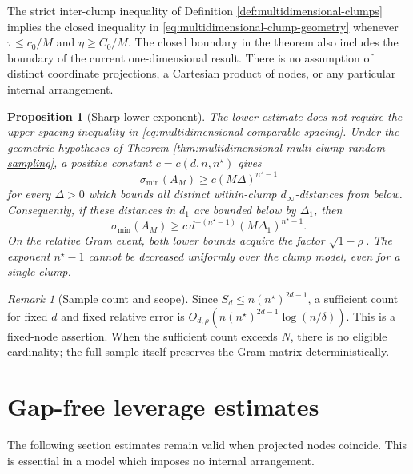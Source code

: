 \documentclass[11pt]{article}
\newtheorem{proposition}[theorem]{Proposition}
\theoremstyle{definition}\newtheorem{definition}[theorem]{Definition}
\theoremstyle{remark}\newtheorem{remark}[theorem]{Remark}
\begin{document}
The strict inter-clump inequality of Definition
\ref{def:multidimensional-clumps} implies the closed inequality in
\eqref{eq:multidimensional-clump-geometry} whenever
$\tau\le c_0/M$ and $\eta\ge C_0/M$. The closed boundary in the theorem
also includes the boundary of the current one-dimensional result.
There is no assumption of distinct coordinate projections, a Cartesian
product of nodes, or any particular internal arrangement.

\begin{proposition}[Sharp lower exponent]\label{prop:multidimensional-sharp-lower}
The lower estimate does not require the upper spacing inequality in
\eqref{eq:multidimensional-comparable-spacing}. Under the geometric
hypotheses of Theorem
\ref{thm:multidimensional-multi-clump-random-sampling}, a positive constant
$c=c(d,n,n^\star)$ gives
\[
 \sigma_{\min}(A_M)\ge c(M\Delta)^{n^\star-1}
\]
for every $\Delta>0$ which bounds all distinct within-clump
$d_\infty$-distances from below. Consequently, if these distances in $d_1$
are bounded below by $\Delta_1$, then
\[
 \sigma_{\min}(A_M)\ge c\,d^{-(n^\star-1)}(M\Delta_1)^{n^\star-1}.
\]
On the relative Gram event, both lower bounds acquire the factor
$\sqrt{1-\rho}$. The exponent $n^\star-1$ cannot be decreased uniformly
over the clump model, even for a single clump.
\end{proposition}

\begin{remark}[Sample count and scope]
Since $S_d\le n(n^\star)^{2d-1}$, a sufficient count for fixed $d$ and
fixed relative error is $O_{d,\rho}(n(n^\star)^{2d-1}\log(n/\delta))$.
This is a fixed-node assertion. When the sufficient count exceeds $N$,
there is no eligible cardinality; the full sample itself preserves the
Gram matrix deterministically.
\end{remark}

\section{Gap-free leverage estimates}
The following section estimates remain valid when projected nodes coincide.
This is essential in a model which imposes no internal arrangement.
\end{document}
